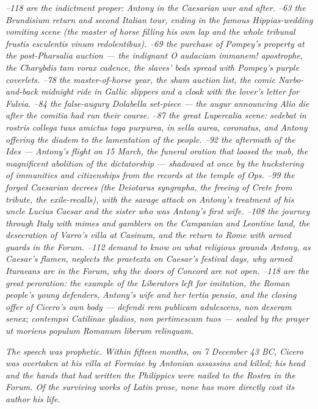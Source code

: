 \textit{--118 are the indictment proper: Antony
in the Caesarian war and after. --63 the
Brundisium return and second Italian tour, ending in the famous
Hippias-wedding vomiting scene (the master of horse filling his
own lap and the whole tribunal \textit{frustis esculentis vinum
redolentibus}). --69 the purchase of Pompey's
property at the post-Pharsalia auction --- the indignant
\textit{O audaciam immanem!} apostrophe, the \textit{Charybdis
tam vorax} cadence, the slaves' beds spread with Pompey's
purple coverlets. --78 the master-of-horse year,
the sham auction list, the comic Narbo-and-back midnight ride
in Gallic slippers and a cloak with the lover's letter for
Fulvia. --84 the false-augury Dolabella set-piece
--- the augur announcing \textit{Alio die} after the comitia
had run their course. --87 the great Lupercalia
scene: \textit{sedebat in rostris collega tuus amictus toga
purpurea, in sella aurea, coronatus}, and Antony offering the
diadem to the lamentation of the people. --92
the aftermath of the Ides --- Antony's flight on 15 March, the
funeral oration that loosed the mob, the magnificent abolition
of the dictatorship --- shadowed at once by the huckstering of
immunities and citizenships from the records at the temple of
Ops. --99 the forged Caesarian decrees (the
Deiotarus syngrapha, the freeing of Crete from tribute, the
exile-recalls), with the savage  attack on
Antony's treatment of his uncle Lucius Caesar and the sister
who was Antony's first wife. --108 the journey
through Italy with mimes and gamblers on the Campanian and
Leontine land, the desecration of Varro's villa at Casinum, and
the return to Rome with armed guards in the Forum. --112 demand to know on what religious grounds Antony, as
Caesar's flamen, neglects the praetexta on Caesar's festival
days, why armed Ituraeans are in the Forum, why the doors of
Concord are not open. --118 are the great
peroration: the example of the Liberators left for imitation,
the Roman people's young defenders, Antony's wife and her
\textit{tertia pensio}, and the closing offer of Cicero's own
body --- \textit{defendi rem publicam adulescens, non deseram
senex; contempsi Catilinae gladios, non pertimescam tuos} ---
sealed by the prayer \textit{ut moriens populum Romanum liberum
relinquam}.}

\textit{The speech was prophetic. Within fifteen months, on 7
December 43 BC, Cicero was overtaken at his villa at Formiae by
Antonian assassins and killed; his head and the hands that had
written the \textit{Philippics} were nailed to the Rostra in
the Forum. Of the surviving works of Latin prose, none has
more directly cost its author his life.}
